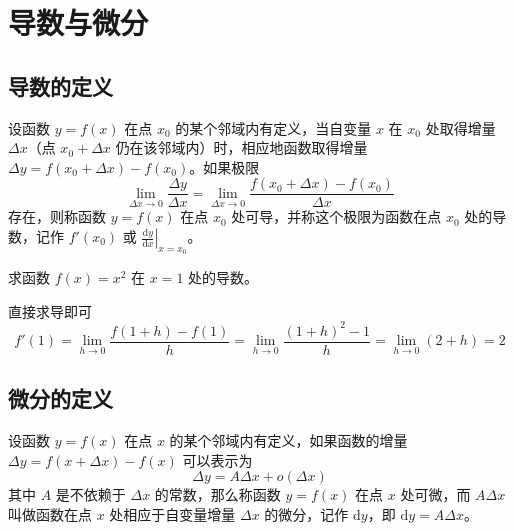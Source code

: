 \chapter{导数与微分}

\section{导数的定义}

\begin{definition}[导数]
设函数 \( y = f(x) \) 在点 \( x_0 \) 的某个邻域内有定义，当自变量 \( x \) 在 \( x_0 \) 处取得增量 \( \Delta x \)（点 \( x_0 + \Delta x \) 仍在该邻域内）时，相应地函数取得增量 \( \Delta y = f(x_0 + \Delta x) - f(x_0) \)。如果极限
\[ \lim_{\Delta x \to 0} \frac{\Delta y}{\Delta x} = \lim_{\Delta x \to 0} \frac{f(x_0 + \Delta x) - f(x_0)}{\Delta x} \]
存在，则称函数 \( y = f(x) \) 在点 \( x_0 \) 处可导，并称这个极限为函数在点 \( x_0 \) 处的导数，记作 \( f'(x_0) \) 或 \( \left. \frac{\mathrm{d} y}{\mathrm{d} x} \right|_{x = x_0} \)。
\end{definition}

\begin{example}
求函数 \( f(x) = x^2 \) 在 \( x = 1 \) 处的导数。
\end{example}

\begin{solution}
直接求导即可
    \[
f'(1) = \lim_{h \to 0} \frac{f(1+h) - f(1)}{h} = \lim_{h \to 0} \frac{(1+h)^2 - 1}{h} = \lim_{h \to 0} (2 + h) = 2
\]
\end{solution}

\section{微分的定义}

\begin{definition}[微分]
设函数 \( y = f(x) \) 在点 \( x \) 的某个邻域内有定义，如果函数的增量 \( \Delta y = f(x + \Delta x) - f(x) \) 可以表示为
\[ \Delta y = A \Delta x + o(\Delta x) \]
其中 \( A \) 是不依赖于 \( \Delta x \) 的常数，那么称函数 \( y = f(x) \) 在点 \( x \) 处可微，而 \( A \Delta x \) 叫做函数在点 \( x \) 处相应于自变量增量 \( \Delta x \) 的微分，记作 \( \mathrm{d}y \)，即 \( \mathrm{d}y = A \Delta x \)。
\end{definition}

